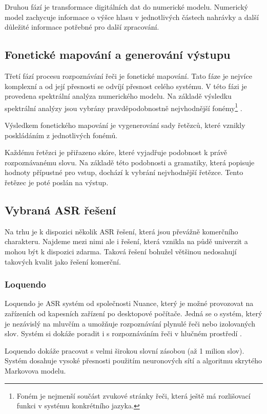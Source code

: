 \documentclass[ing,male,java,dept460,twoside]{diploma}						%
\begin{document}
Druhou fází je transformace digitálních dat do numerické modelu. Numerický model zachycuje informace o výšce hlasu v jednotlivých částech nahrávky a další důležité informace potřebné pro další zpracování.

\subsection{Fonetické mapování a generování výstupu}
Třetí fází procesu rozpoznávání řeči je fonetické mapování. Tato fáze je nejvíce komplexní a od její přesnosti se odvíjí přesnost celého systému. V této fázi je provedena spektrální analýza numerického modelu. Na základě výsledku spektrální analýzy jsou vybrány pravděpodobnostně nejvhodnější fonémy\footnote{Foném je nejmenší součást zvukové stránky řeči, která ještě má rozlišovací funkci v systému konkrétního jazyka.} \cite{vxmldevguide}.

Výsledkem fonetického mapování je vygenerování sady řetězců, které vznikly poskládáním z jednotlivých fonémů.

Každému řetězci je přiřazeno skóre, které vyjadřuje podobnost k právě rozpoznávanému slovu. Na základě této podobnosti a gramatiky, která popisuje hodnoty přípustné pro vstup, dochází k vybrání nejvhodnější řetězce. Tento řetězec je poté poslán na výstup.

\subsection{Vybraná ASR řešení}
Na trhu je k dispozici několik ASR řešení, která jsou převážně komerčního charakteru. Najdeme mezi nimi ale i řešení, která vznikla na půdě univerzit a mohou být k dispozici zdarma. Taková řešení bohužel většinou nedosahují takových kvalit jako řešení komerční.

\subsubsection{Loquendo}
Loquendo je ASR systém od společnosti Nuance, který je možné provozovat na zařízeních od kapesních zařízení po desktopové počítače. Jedná se o systém, který je nezávislý na mluvčím a umožňuje rozpoznávání plynulé řeči nebo izolovaných slov. Systém si dokáže poradit i s rozpoznáváním řeči v hlučném prostředí \cite{loquendo}.

Loquendo dokáže pracovat s velmi širokou slovní zásobou (až 1 milion slov). Systém dosahuje vysoké přesnosti použitím neuronových sítí a algoritmu skrytého Markovova modelu.
\end{document}
